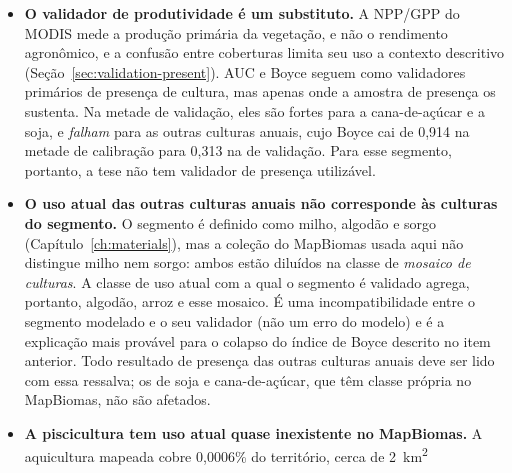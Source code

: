 \begin{itemize}
    (Seção~\ref{sec:holdout}) usa blocos de $\approx$130~km, dimensionados pelo alcance medido do
    resíduo, mas três ressalvas limitam o que ela garante. Primeira: o bloco fica acima do alcance
    medido para soja e cana-de-açúcar, mas \emph{abaixo} do alcance das outras culturas anuais, para
    as quais não remove toda a dependência. Segunda: o alcance estimado cresce com a janela de
    observação, o que indica uma tendência regional sem alcance finito dentro do próprio território.
    As duas leituras estão quantificadas na Seção~\ref{anx:holdout}. Terceira: com cerca de quinze
    blocos por metade, as duas metades não são amostras intercambiáveis do estado. A diferença entre
    calibração e validação reflete, portanto, o território, e não otimismo do modelo (a solução é
    discutida na Seção~\ref{sec:futurework}).
  \item \textbf{O validador de produtividade é um substituto.} A NPP/GPP do MODIS mede a produção
    primária da vegetação, e não o rendimento agronômico, e a confusão entre coberturas limita seu
    uso a contexto descritivo (Seção~\ref{sec:validation-present}). AUC e Boyce seguem como
    validadores primários de presença de cultura, mas apenas onde a amostra de presença os
    sustenta. Na metade de validação, eles são fortes para a cana-de-açúcar e a soja, e
    \emph{falham} para as outras culturas anuais, cujo Boyce cai de 0,914 na metade de calibração
    para 0,313 na de validação. Para esse segmento, portanto, a tese não tem validador de presença
    utilizável.
  \item \textbf{O uso atual das outras culturas anuais não corresponde às culturas do segmento.} O
    segmento é definido como milho, algodão e sorgo (Capítulo~\ref{ch:materials}), mas a coleção do
    MapBiomas usada aqui não distingue milho nem sorgo: ambos estão diluídos na classe de
    \emph{mosaico de culturas}. A classe de uso atual com a qual o segmento é validado agrega,
    portanto, algodão, arroz e esse mosaico. É uma incompatibilidade entre o segmento modelado e o
    seu validador (não um erro do modelo) e é a explicação mais provável para o colapso do índice de
    Boyce descrito no item anterior. Todo resultado de presença das outras culturas anuais deve ser
    lido com essa ressalva; os de soja e cana-de-açúcar, que têm classe própria no MapBiomas, não são
    afetados.
  \item \textbf{A piscicultura tem uso atual quase inexistente no MapBiomas.} A aquicultura
    mapeada cobre 0,0006\% do território, cerca de 2~km\textsuperscript{2}

\end{itemize}
